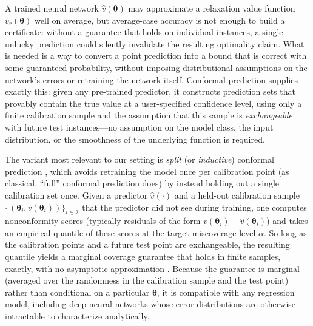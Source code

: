 \documentclass[10pt]{article} %
\theoremstyle{plain}
\theoremstyle{definition}
\theoremstyle{remark}
\begin{document}
A trained neural network $\hat{v}(\bm{\theta})$ may approximate a relaxation value function $v_r(\bm{\theta})$ well on average, but average-case accuracy is not enough to build a certificate: without a guarantee that holds on individual instances, a single unlucky prediction could silently invalidate the resulting optimality claim. What is needed is a way to convert a point prediction into a bound that is correct with some guaranteed probability, without imposing distributional assumptions on the network's errors or retraining the network itself. Conformal prediction \citep{vovk2005algorithmic} supplies exactly this: given any pre-trained predictor, it constructs prediction sets that provably contain the true value at a user-specified confidence level, using only a finite calibration sample and the assumption that this sample is \textit{exchangeable} with future test instances---no assumption on the model class, the input distribution, or the smoothness of the underlying function is required.

The variant most relevant to our setting is \textit{split} (or \textit{inductive}) conformal prediction \citep{lei2018distribution}, which avoids retraining the model once per calibration point (as classical, ``full'' conformal prediction does) by instead holding out a single calibration set once. Given a predictor $\hat{v}(\cdot)$ and a held-out calibration sample $\{(\bm{\theta}_i, v(\bm{\theta}_i))\}_{i \in \mathcal{I}}$ that the predictor did not see during training, one computes nonconformity scores (typically residuals of the form $v(\bm{\theta}_i) - \hat{v}(\bm{\theta}_i)$) and takes an empirical quantile of these scores at the target miscoverage level $\alpha$. So long as the calibration points and a future test point are exchangeable, the resulting quantile yields a marginal coverage guarantee that holds in finite samples, exactly, with no asymptotic approximation \citep{angelopoulos2023conformal}. Because the guarantee is marginal (averaged over the randomness in the calibration sample and the test point) rather than conditional on a particular $\bm{\theta}$, it is compatible with any regression model, including deep neural networks whose error distributions are otherwise intractable to characterize analytically.
\end{document}
